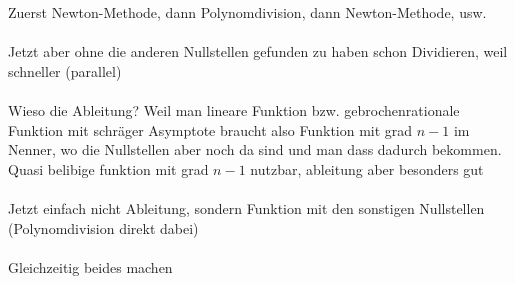 \documentclass[12pt]{article}
\begin{document}
Zuerst Newton-Methode, dann Polynomdivision, dann Newton-Methode, usw.
\\\\
Jetzt aber ohne die anderen Nullstellen gefunden zu haben schon Dividieren, weil schneller (parallel)
\\\\
Wieso die Ableitung? Weil man lineare Funktion bzw. gebrochenrationale Funktion mit schräger Asymptote braucht also Funktion mit grad $n-1$ im Nenner, wo die Nullstellen aber noch da sind und man dass dadurch bekommen. Quasi belibige funktion mit grad $n-1$ nutzbar, ableitung aber besonders gut
\\\\
Jetzt einfach nicht Ableitung, sondern Funktion mit den sonstigen Nullstellen (Polynomdivision direkt dabei)
\\\\
Gleichzeitig beides machen
\end{document}
